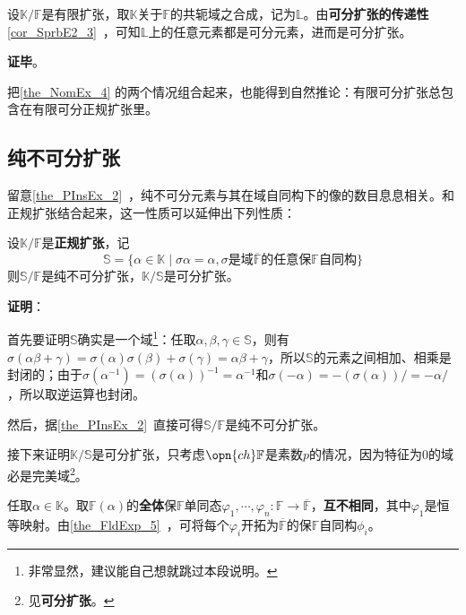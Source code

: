 设$\mathbb{K}/\mathbb{F}$是有限扩张，取$\mathbb{K}$关于$\mathbb{F}$的共轭域之合成，记为$\mathbb{L}$。由\textbf{可分扩张的传递性}\autoref{cor_SprbE2_3}~，可知$\mathbb{L}$上的任意元素都是可分元素，进而是可分扩张。

\textbf{证毕}。

把\autoref{the_NomEx_4} 的两个情况组合起来，也能得到自然推论：有限可分扩张总包含在有限可分正规扩张里。


\subsection{纯不可分扩张}



留意\autoref{the_PInsEx_2}~，纯不可分元素与其在域自同构下的像的数目息息相关。和正规扩张结合起来，这一性质可以延伸出下列性质：

\begin{theorem}{}\label{the_NomEx_5}
设$\mathbb{K}/\mathbb{F}$是\textbf{正规扩张}，记
\begin{equation}\label{eq_NomEx_1}
\mathbb{S}=\{\alpha\in\mathbb{K}\mid \sigma\alpha = \alpha, \sigma\text{是域}\overline{\mathbb{F}}\text{的任意保}\mathbb{F}\text{自同构}\}
\end{equation}
则$\mathbb{S}/\mathbb{F}$是纯不可分扩张，$\mathbb{K}/\mathbb{S}$是可分扩张。
\end{theorem}

\textbf{证明}：

首先要证明$\mathbb{S}$确实是一个域\footnote{非常显然，建议能自己想就跳过本段说明。}：任取$\alpha, \beta, \gamma\in\mathbb{S}$，则有$\sigma(\alpha\beta+\gamma)=\sigma(\alpha)\sigma(\beta)+\sigma(\gamma)=\alpha\beta+\gamma$，所以$\mathbb{S}$的元素之间相加、相乘是封闭的；由于$\sigma(\alpha^{-1})=(\sigma(\alpha))^{-1}=\alpha^{-1}$和$\sigma(-\alpha)=-(\sigma(\alpha))/=-\alpha/$，所以取逆运算也封闭。

然后，据\autoref{the_PInsEx_2}~直接可得$\mathbb{S}/\mathbb{F}$是纯不可分扩张。

接下来证明$\mathbb{K}/\mathbb{S}$是可分扩张，只考虑$\opn{ch}\mathbb{F}$是素数$p$的情况，因为特征为$0$的域必是完美域\footnote{见\textbf{可分扩张}。}。

任取$\alpha\in\mathbb{K}$。取$\mathbb{F}(\alpha)$的\textbf{全体}保$\mathbb{F}$单同态$\varphi_1, \cdots, \varphi_n:\mathbb{F}\to\overline{\mathbb{F}}$，\textbf{互不相同}，其中$\varphi_1$是恒等映射。由\autoref{the_FldExp_5}~，可将每个$\varphi_i$开拓为$\overline{\mathbb{F}}$的保$\mathbb{F}$自同构$\phi_i$。

